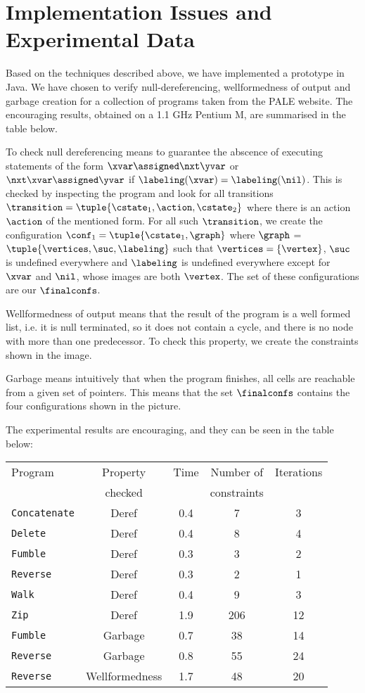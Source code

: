 \section{Implementation Issues and Experimental Data}
\label{implementation:section}

Based on the techniques described above, we have implemented a prototype in Java. We have chosen to verify null-dereferencing, wellformedness of output and garbage creation for a collection of programs taken from the PALE website. The encouraging results, obtained on a 1.1 GHz Pentium M, are summarised in the table below.

To check null dereferencing means to guarantee the abscence of executing statements of the form $\xvar\assigned\nxt\yvar$ or $\nxt\xvar\assigned\yvar$ if $\labeling(\xvar)=\labeling(\nil)$. This is checked by inspecting the program and look for all transitions $\transition=\tuple{\cstate_1,\action,\cstate_2}$ where there is an action $\action$ of the mentioned form. For all such $\transition$, we create the configuration $\conf_1=\tuple{\cstate_1,\graph}$ where $\graph$ = $\tuple{\vertices,\suc,\labeling}$ such that $\vertices=\{\vertex\}$, $\suc$ is undefined everywhere and $\labeling$ is undefined everywhere except for $\xvar$ and $\nil$, whose images are both $\vertex$. The set of these configurations are our $\finalconfs$.

Wellformedness of output means that the result of the program is a well formed list, i.e. it is null terminated, so it does not contain a cycle, and there is no node with more than one predecessor. To check this property, we create the constraints shown in the image.

Garbage means intuitively that when the program finishes, all cells are reachable from a given set of pointers. This means that the set $\finalconfs$ contains the four configurations shown in the picture.

The experimental results are encouraging, and they can be seen in the table below:

\begin{tabular}{l|c|c|c|c}
Program & Property & Time & Number of & Iterations \\
 & checked & & constraints & \\
\hline
\verb+Concatenate+ & Deref & 0.4& 7 & 3\\
\verb+Delete+ & Deref & 0.4 & 8 & 4\\
\verb+Fumble+ & Deref & 0.3 & 3 & 2\\
\verb+Reverse+ & Deref & 0.3 & 2 & 1\\
\verb+Walk+ & Deref & 0.4 & 9 & 3\\
\verb+Zip+ & Deref & 1.9 & 206 & 12\\
\verb+Fumble+ & Garbage & 0.7 & 38 & 14\\
\verb+Reverse+ & Garbage & 0.8 & 55 & 24\\
\verb+Reverse+ & Wellformedness & 1.7 & 48 & 20
\end{tabular}
